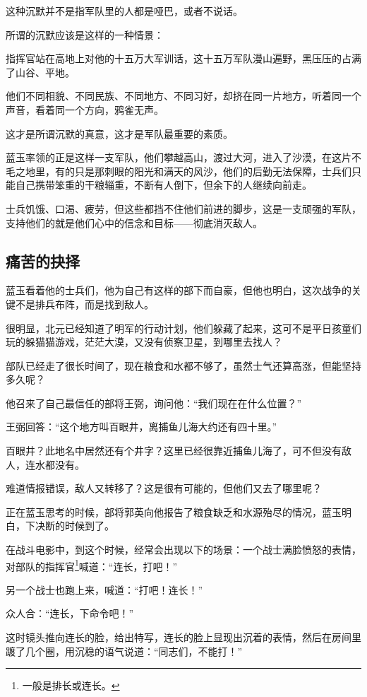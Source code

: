 \begin{multicols}{\theparacolNo}
		这种沉默并不是指军队里的人都是哑巴，或者不说话。

		所谓的沉默应该是这样的一种情景：

		指挥官站在高地上对他的十五万大军训话，这十五万军队漫山遍野，黑压压的占满了山谷、平地。

		他们不同相貌、不同民族、不同地方、不同习好，却挤在同一片地方，听着同一个声音，看着同一个方向，鸦雀无声。

		这才是所谓沉默的真意，这才是军队最重要的素质。

		蓝玉率领的正是这样一支军队，他们攀越高山，渡过大河，进入了沙漠，在这片不毛之地里，有的只是那刺眼的阳光和满天的风沙，他们的后勤无法保障，士兵们只能自己携带笨重的干粮辎重，不断有人倒下，但余下的人继续向前走。

		士兵饥饿、口渴、疲劳，但这些都挡不住他们前进的脚步，这是一支顽强的军队，支持他们的就是他们心中的信念和目标——彻底消灭敌人。

		\subsection{痛苦的抉择}
		蓝玉看着他的士兵们，他为自己有这样的部下而自豪，但他也明白，这次战争的关键不是排兵布阵，而是找到敌人。

		很明显，北元已经知道了明军的行动计划，他们躲藏了起来，这可不是平日孩童们玩的躲猫猫游戏，茫茫大漠，又没有侦察卫星，到哪里去找人？

		部队已经走了很长时间了，现在粮食和水都不够了，虽然士气还算高涨，但能坚持多久呢？

		他召来了自己最信任的部将王弼，询问他：“我们现在在什么位置？”

		王弼回答：“这个地方叫百眼井，离捕鱼儿海大约还有四十里。”

		百眼井？此地名中居然还有个井字？这里已经很靠近捕鱼儿海了，可不但没有敌人，连水都没有。

		难道情报错误，敌人又转移了？这是很有可能的，但他们又去了哪里呢？

		正在蓝玉思考的时候，部将郭英向他报告了粮食缺乏和水源殆尽的情况，蓝玉明白，下决断的时候到了。

		在战斗电影中，到这个时候，经常会出现以下的场景：一个战士满脸愤怒的表情，对部队的指挥官\footnote{一般是排长或连长。}喊道：“连长，打吧！”

		另一个战士也跑上来，喊道：“打吧！连长！”

		众人合：“连长，下命令吧！”

		这时镜头推向连长的脸，给出特写，连长的脸上显现出沉着的表情，然后在房间里踱了几个圈，用沉稳的语气说道：“同志们，不能打！”


\end{multicols}
